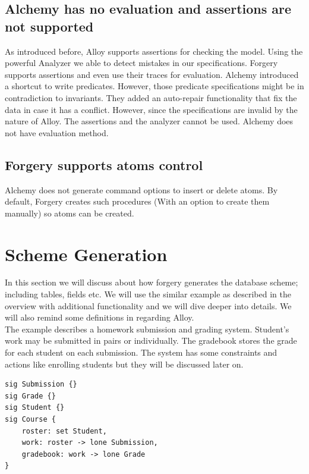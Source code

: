 \documentclass[oneside]{book}
\begin{document}
\subsection{Alchemy has no evaluation and assertions are not supported}
As introduced before, Alloy supports assertions for checking the model. Using the powerful Analyzer we able to detect mistakes in our specifications. Forgery supports assertions and even use their traces for evaluation. Alchemy introduced a shortcut to write predicates. However, those predicate specifications might be in contradiction to invariants. They added an auto-repair functionality that fix the data in case it has a conflict. However, since the specifications are invalid by the nature of Alloy. The assertions and the analyzer cannot be used. Alchemy does not have evaluation method.\\

\subsection{Forgery supports atoms control}
Alchemy does not generate command options to insert or delete atoms. By default, Forgery creates such procedures (With an option to create them manually) so atoms can be created.

\newpage

\section{Scheme Generation}
\label{sec:schemegen}

In this section we will discuss about how forgery generates the database scheme; including tables, fields etc. We will use the similar example as described in the overview with additional functionality and we will dive deeper into details. We will also remind some definitions in regarding Alloy.\\

\noindent The example describes a homework submission and grading system. Student's work may be submitted in pairs or individually. The gradebook stores the grade for each student on each submission. The system has some constraints and actions like enrolling students but they will be discussed later on.\\
\begin{lstlisting}
sig Submission {}
sig Grade {}
sig Student {}
sig Course {
	roster: set Student,
	work: roster -> lone Submission,
	gradebook: work -> lone Grade
}
\end{lstlisting}
\end{document}
